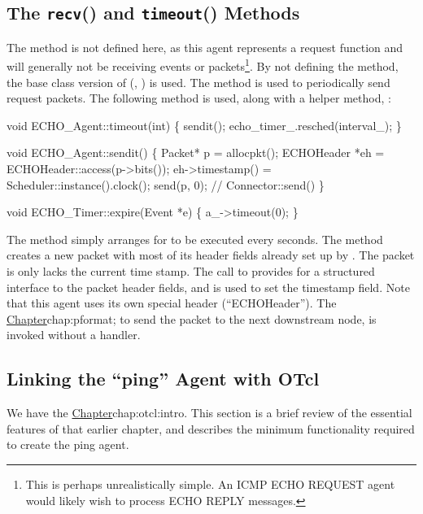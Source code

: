 \subsection{The \texttt{recv}() and \texttt{timeout}() Methods}
\label{sec:agents:exmethods}

The  method is not defined here, as this agent
represents a request function and will generally not be receiving
events or packets\footnote{This is perhaps unrealistically simple.
An ICMP ECHO REQUEST agent would likely wish to process
ECHO REPLY messages.}.
By not defining the  method, the base class version
of  (\ie, ) is used.
The  method is used to periodically send request packets.
The following  method is used, along with a helper
method, :
\begin{program}
        void ECHO_Agent::timeout(int)
        \{
                sendit();
                echo_timer_.resched(interval_);
        \}

        void ECHO_Agent::sendit()
        \{
                Packet* p = allocpkt();
                ECHOHeader *eh = ECHOHeader::access(p->bits());
                eh->timestamp() = Scheduler::instance().clock();
                send(p, 0);     // {\cf Connector::send()}
        \}

        void ECHO_Timer::expire(Event *e)
        \{
                a_->timeout(0);
        \}
\end{program}
The  method simply arranges for  to be
executed every  seconds.
The  method creates a new packet with most of its
header fields already set up by .
The packet is only lacks the current time stamp. 
The call to  provides for a structured interface to the
packet header fields, and is used to set the timestamp field.
Note that this agent uses its own special header (``ECHOHeader'').
The 
\href{creation and use of packet headers is described in
later chapter}{Chapter}{chap:pformat};
to send the packet to the next downstream node, 
is invoked without a handler.

\subsection{Linking the ``ping'' Agent with OTcl}
\label{sec:agents:exlinkage}

We have the 
\href{methods and mechanisms for establishing OTcl Linkage earlier}{%
        Chapter}{chap:otcl:intro}.
This section is a brief review of the essential features of that
earlier chapter, and describes the minimum functionality required to 
create the ping agent.

